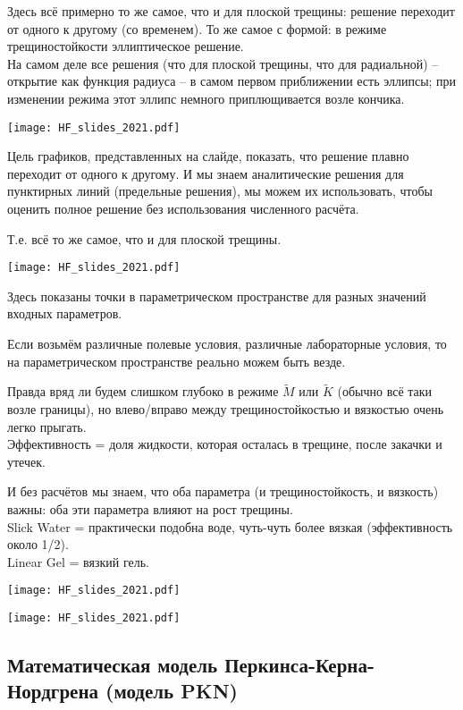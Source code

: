 \documentclass[main.tex]{subfiles}
\begin{document}
Здесь всё примерно то же самое, что и для плоской трещины: решение переходит от одного к другому (со временем).
То же самое с формой: в режиме трещиностойкости эллиптическое решение.
\\

На самом деле все решения (что для плоской трещины, что для радиальной) -- открытие как функция радиуса -- в самом первом приближении есть эллипсы; при изменении режима этот эллипс немного приплющивается возле кончика.

\texttt{[image: HF\_slides\_2021.pdf]}

Цель графиков, представленных на слайде, показать, что решение плавно переходит от одного к другому.
И мы знаем аналитические решения для пунктирных линий (предельные решения), мы можем их использовать, чтобы оценить полное решение без использования численного расчёта.

Т.е. всё то же самое, что и для плоской трещины.

\texttt{[image: HF\_slides\_2021.pdf]}

Здесь показаны точки в параметрическом пространстве для разных значений входных параметров.

Если возьмём различные полевые условия, различные лабораторные условия, то на параметрическом пространстве реально можем быть везде.

Правда вряд ли будем слишком глубоко в режиме $\tilde{M}$ или $\tilde{K}$ (обычно всё таки возле границы), но влево/вправо между трещиностойкостью и вязкостью очень легко прыгать.
\\

Эффективность = доля жидкости, которая осталась в трещине, после закачки и утечек.

И без расчётов мы знаем, что оба параметра (и трещиностойкость, и вязкость) важны: оба эти параметра влияют на рост трещины.
\\

Slick Water = практически подобна воде, чуть-чуть более вязкая (эффективность около 1/2).
\\

Linear Gel = вязкий гель.

\texttt{[image: HF\_slides\_2021.pdf]}



\texttt{[image: HF\_slides\_2021.pdf]}



\subsection{Математическая модель Перкинса-Керна-Нордгрена (модель PKN)}
\end{document}
